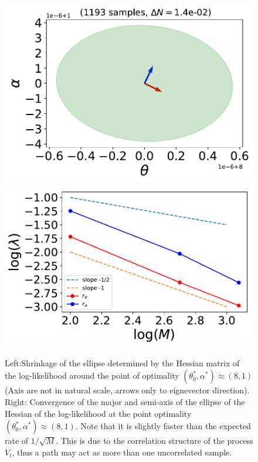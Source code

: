 \documentclass[10pt,twocolumn,letterpaper]{article}
\begin{document}
\begin{figure}[t]
\begin{center}
   \includegraphics[width=0.6\linewidth]{ellipse1193_samples_dN=14e-02.pdf}
    \includegraphics[width=0.6\linewidth]{ellipse_conv_samples_dN=14e-02.pdf}
\end{center}
   \caption{Left:Shrinkage of the ellipse determined by the Hessian matrix of the log-likelihood around the point of optimality $(\theta_0^*, \alpha^*)\approx (8,1)$ (Axis are not in natural scale, arrows only to  eignevector direction). Right: Convergence of the major and semi-axis of the ellipse  of the Hessian of the log-likelihood at the point optimality $(\theta_0^*, \alpha^*)\approx (8,1)$. Note that it is slightly faster than the expected rate of $1/\sqrt{M}$. This is due to the correlation structure of the process $V_t$, thus a path may act  as more than one  uncorrelated sample.}
\label{ellipse_drawing}
\end{figure}
\end{document}
